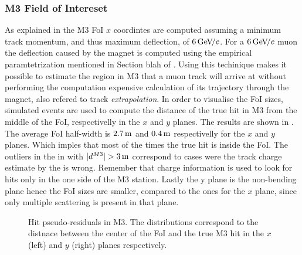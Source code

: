 \subsubsection{M3 Field of Intereset}
As explained in  the M3 FoI $x$ coordintes are computed assuming a minimum track momentum, and thus maximum deflection,
of $6{\mathrm{\,Ge\kern -0.1em V\!/}c}$. For a $6{\mathrm{\,Ge\kern -0.1em V\!/}c}$ muon the deflection caused by the \lhcb magnet is computed using the empirical paramtetrization mentioned in Section blah of \cite{roelThesis}.
Using this techinique makes it possible to estimate the region in M3 that a muon track will arrive at without performing the computation
expensive calculation of its trajectory through the \lhcb magnet, also refered to track {\it extrapolation}. In order to visualise the FoI sizes,
simulated events are used to compute the distance of the true hit in M3 from the middle of the FoI, respectivelly in the $x$ and $y$ planes.
The results are shown in . The average FoI half-width is $2.7\rm \,m$ and $0.4\rm \,m$ respectivelly for the $x$ and $y$ planes.
Which imples that most of the times the true hit is inside the FoI. The outliers in the  in with $|d^{M3}|>3\m$
correspond to cases were the track charge estimate by the \ttracker is wrong. Remember that charge information is used to
look for hits only in the one side of the M3 station. Lastly the y plane is the non-bending plane hence the FoI sizes
are smaller, compared to the ones for the $x$ plane, since only multiple scattering is present in that plane.


\begin{figure}[t]
  \centering
  \begin{subfigure}{0.5\textwidth}
    \scalebox{.6}{}
    \caption{}
    \label{mvTTm_res_x}
  \end{subfigure}%
  \hfill%
  \begin{subfigure}{0.5\textwidth}
    \scalebox{.6}{}
    \caption{}
    \label{mvm_res_y}
  \end{subfigure}
  \caption{Hit pseudo-residuals in M3. The distributions correspond to the distnace between the center of the FoI and the true M3 hit
           in the $x$ (left) and $y$ (right) planes respectively.}
 \label{mvm_res}
\end{figure}

